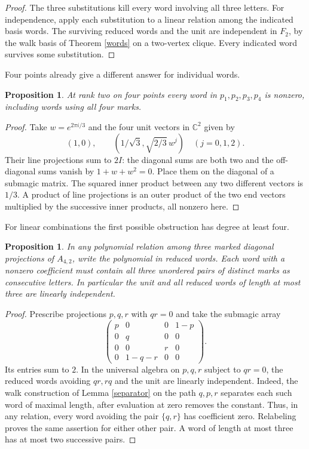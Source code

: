 \documentclass[11pt,a4paper]{article}
\newtheorem{prop}[thm]{Proposition}
\begin{document}
\begin{proof}
The three substitutions kill every word involving all three letters. For independence, apply each substitution to a linear relation among the indicated basis words. The surviving reduced words and the unit are independent in $F_2$, by the walk basis of Theorem \ref{words} on a two-vertex clique. Every indicated word survives some substitution.
\end{proof}

Four points already give a different answer for individual words.

\begin{prop}\label{tetrawords}
At rank two on four points every word in $p_1,p_2,p_3,p_4$ is nonzero, including words using all four marks.
\end{prop}
\begin{proof}
Take $w=e^{2\pi i/3}$ and the four unit vectors in $\mathbb C^2$ given by
\[
 (1,0),\qquad (1/\sqrt3,\sqrt{2/3}\,w^j)\quad (j=0,1,2).
\]
Their line projections sum to $2I$: the diagonal sums are both two and the off-diagonal sums vanish by $1+w+w^2=0$. Place them on the diagonal of a submagic matrix. The squared inner product between any two different vectors is $1/3$. A product of line projections is an outer product of the two end vectors multiplied by the successive inner products, all nonzero here.
\end{proof}

For linear combinations the first possible obstruction has degree at least four.

\begin{prop}\label{smalldegree}
In any polynomial relation among three marked diagonal projections of $A_{4,2}$, write the polynomial in reduced words. Each word with a nonzero coefficient must contain all three unordered pairs of distinct marks as consecutive letters. In particular the unit and all reduced words of length at most three are linearly independent.
\end{prop}
\begin{proof}
Prescribe projections $p,q,r$ with $qr=0$ and take the submagic array
\[
 \begin{pmatrix}p&0&0&1-p\\0&q&0&0\\0&0&r&0\\0&1-q-r&0&0\end{pmatrix}.
\]
Its entries sum to $2$. In the universal algebra on $p,q,r$ subject to $qr=0$, the reduced words avoiding $qr,rq$ and the unit are linearly independent. Indeed, the walk construction of Lemma \ref{separator} on the path $q,p,r$ separates each such word of maximal length, after evaluation at zero removes the constant. Thus, in any relation, every word avoiding the pair $\{q,r\}$ has coefficient zero. Relabeling proves the same assertion for either other pair. A word of length at most three has at most two successive pairs.
\end{proof}
\end{document}

